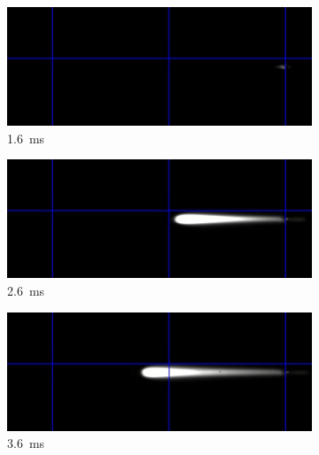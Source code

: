 \begin{figure}[h]
    \centering
    \begin{subfigure}[t]{0.47\textwidth}
        \centering
        \includegraphics[width=\textwidth]{assets/5 results/1msFrames/16.jpg}
        \caption{\qty{1.6}{ms}}
        \label{fig:growth_frames_16}
    \end{subfigure}
    \hfill
    \begin{subfigure}[t]{0.47\textwidth}
        \centering
        \includegraphics[width=\textwidth]{assets/5 results/1msFrames/26.jpg}
        \caption{\qty{2.6}{ms}}
        \label{fig:growth_frames_26}
    \end{subfigure}
    \hfill
    \begin{subfigure}[t]{0.47\textwidth}
        \centering
        \includegraphics[width=\textwidth]{assets/5 results/1msFrames/36.jpg}
        \caption{\qty{3.6}{ms}}
        \label{fig:growth_frames_36}
    \end{subfigure}
    \hfill
    \begin{subfigure}[t]{0.47\textwidth}

\end{subfigure}
\end{figure}
